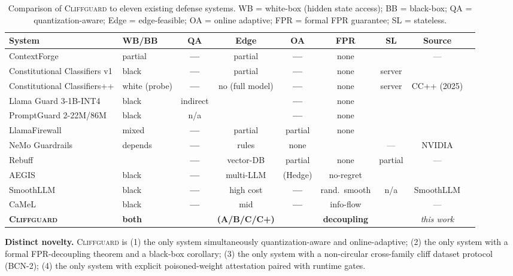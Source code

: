 \documentclass[11pt,a4paper]{article}
\newcommand{\CG}{\textsc{Cliffguard}}
\newcommand{\YES}{\textcolor{green!50!black}{\textbf{\checkmark}}}
\newcommand{\NO}{\textcolor{red!60!black}{\textbf{---}}}
\begin{document}
\begin{table}[H]
  \centering
  \small
  \caption{Comparison of \CG{} to eleven existing defense systems.
           WB = white-box (hidden state access); BB = black-box;
           QA = quantization-aware; Edge = edge-feasible;
           OA = online adaptive; FPR = formal FPR guarantee; SL = stateless.}
  \label{tab:comparison}
  \begin{tabularx}{\textwidth}{@{}lXccccccc@{}}
    \toprule
    System & WB/BB & QA & Edge & OA & FPR & SL & Source \\
    \midrule
    ContextForge & partial & \NO & partial & \NO & none & \YES & --- \\
    Constitutional Classifiers v1 & black & \NO & partial & \NO & none & server & \citet{sharma2025cc} \\
    Constitutional Classifiers++ & white (probe) & \NO & no (full model) & \NO & none & server & CC++ (2025) \\
    Llama Guard 3-1B-INT4 & black & indirect & \YES & \NO & none & \YES & \citet{inan2023llama_guard} \\
    PromptGuard 2-22M/86M & black & n/a & \YES & \NO & none & \YES & \citet{llamafirewall2025} \\
    LlamaFirewall & mixed & \NO & partial & partial & none & \YES & \citet{llamafirewall2025} \\
    NeMo Guardrails & depends & \NO & rules & none & \YES & --- & NVIDIA \\
    Rebuff & \YES & \NO & vector-DB & partial & none & partial & --- \\
    AEGIS & black & \NO & multi-LLM & \YES{} (Hedge) & no-regret & \YES & \citet{ghosh2024aegis} \\
    SmoothLLM & black & \NO & high cost & \NO & rand.\ smooth & n/a & SmoothLLM \\
    CaMeL & black & \NO & mid & \NO & info-flow & \YES & --- \\
    \midrule
    \textbf{\CG{}} & \textbf{both} & \textbf{\YES} & \textbf{\YES (A/B/C/C+)} & \textbf{\YES} & \textbf{decoupling} & \textbf{\YES} & \textit{this work} \\
    \bottomrule
  \end{tabularx}
\end{table}

\textbf{Distinct novelty.}
\CG{} is (1) the only system simultaneously quantization-aware and online-adaptive;
(2) the only system with a formal FPR-decoupling theorem and a black-box corollary;
(3) the only system with a non-circular cross-family cliff dataset protocol (BCN-2);
(4) the only system with explicit poisoned-weight attestation paired with runtime gates.
\end{document}
